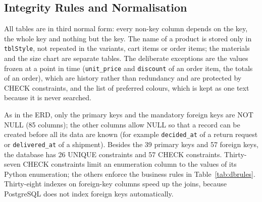\subsection{Integrity Rules and Normalisation}
\label{subsec:integrity}
All tables are in third normal form: every non-key column depends on the key, the whole key and nothing but the key. The name of a product is stored only in \texttt{tblStyle}, not repeated in the variants, cart items or order items; the materials and the size chart are separate tables. The deliberate exceptions are the values frozen at a point in time (\texttt{unit\_price} and \texttt{discount} of an order item, the totals of an order), which are history rather than redundancy and are protected by CHECK constraints, and the list of preferred colours, which is kept as one text because it is never searched.

As in the ERD, only the primary keys and the mandatory foreign keys are NOT NULL (85 columns); the other columns allow NULL so that a record can be created before all its data are known (for example \texttt{decided\_at} of a return request or \texttt{delivered\_at} of a shipment). Besides the 39 primary keys and 57 foreign keys, the database has 26 UNIQUE constraints and 57 CHECK constraints. Thirty-seven CHECK constraints limit an enumeration column to the values of its Python enumeration; the others enforce the business rules in Table~\ref{tab:dbrules}. Thirty-eight indexes on foreign-key columns speed up the joins, because PostgreSQL does not index foreign keys automatically.

